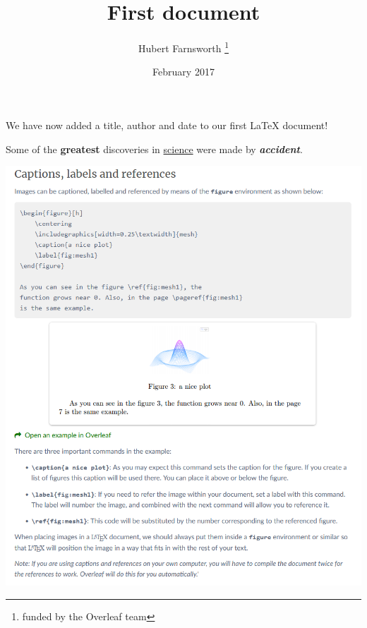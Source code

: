 \documentclass[12pt, letterpaper, twoside]{article}    %
\title{First document}
\author{Hubert Farnsworth
\thanks{funded by the Overleaf team}}
\date{February 2017}
\begin{document}
\maketitle

We have now added a title, author and date to our first \LaTeX{} document!

Some of the \textbf{greatest}
discoveries in \underline{science} 
were made by \textbf{\textit{accident}}.

\includegraphics[width=18cm]{ravnanjeSSlikami}
\end{document}
